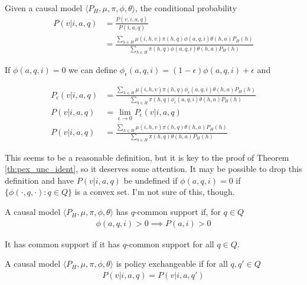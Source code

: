 \begin{definition}
Given a causal model $\langle P_H, \mu,\pi,\phi,\theta\rangle$, the conditional probability
\begin{align}
    P(v|i,a,q) &= \frac{P(v,i,a,q)}{P(i,a,q)} \\
               &= \frac{\sum_{h\in H} \mu(i,h,v)\pi(h,q) \phi(a,q,i) \theta(h,a) P_H(h)}{\sum_{h\in H} \pi(h,q) \phi(a,q,i) \theta(h,a) P_H(h)}
\end{align}

If $\phi(a,q,i) = 0$ we can define $\phi_\epsilon(a,q,i) = (1-\epsilon) \phi(a,q,i) + \epsilon$ and 

\begin{align}
    P_{\epsilon}(v|i,a,q) &= \frac{\sum_{h\in H} \mu(i,h,v)\pi(h,q) \phi_\epsilon(a,q,i) \theta(h,a) P_H(h)}{\sum_{h\in H} \pi(h,q) \phi_\epsilon(a,q,i) \theta(h,a) P_H(h)} \\
    P(v|i,a,q)            &= \lim_{\epsilon \to 0} P_{\epsilon}(v|i,a,q)\\
    P(v|i,a,q)            &= \frac{\sum_{h\in H} \mu(i,h,v)\pi(h,q) \theta(h,a) P_H(h)}{\sum_{h\in H} \pi(h,q) \theta(h,a) P_H(h)} \label{eq:impossible_condition}
\end{align}
\end{definition}

\begin{remark}
This seems to be a reasonable definition, but it is key to the proof of Theorem \ref{th:pex_unc_ident}, so it deserves some attention. It may be possible to drop this definition and have $P(v|i,a,q)$ be undefined if $\phi(a,q,i)=0$ if $\{\phi(\cdot,q,\cdot):q\in Q\}$ is a convex set. I'm not sure of this, though.
\end{remark}


\begin{definition}
A causal model $\langle P_H, \mu,\pi,\phi,\theta\rangle$ has $q$-common support if, for $q\in Q$
\begin{align}
    \phi(a,q,i)>0\implies P(a,i)>0
\end{align}

It has common support if it has $q$-common support for all $q\in Q$.
\end{definition}



\begin{definition}
A causal model $\langle P_H, \mu,\pi,\phi,\theta\rangle$ is policy exchangeable if for all $q,q'\in Q$
\begin{align}
    P(v|i,a,q) = P(v|i,a,q')
\end{align}
\end{definition}

